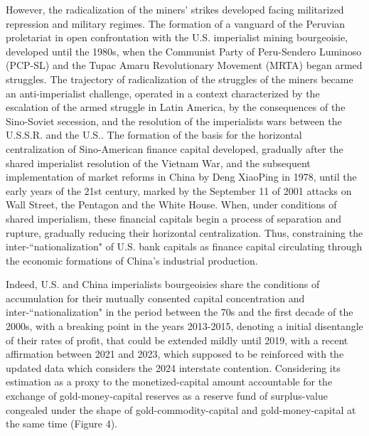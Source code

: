 \documentclass[]{interact}
\theoremstyle{plain}%
\theoremstyle{definition}
\theoremstyle{remark}
\begin{document}
However, the radicalization of the miners' strikes developed facing militarized repression and military regimes. The formation of a vanguard of the Peruvian proletariat in open confrontation with the U.S. imperialist mining bourgeoisie, developed until the 1980s, when the Communist Party of Peru-Sendero Luminoso (PCP-SL) and the Tupac Amaru Revolutionary Movement (MRTA) began armed struggles. The trajectory of radicalization of the struggles of the miners became an anti-imperialist challenge, operated in a context characterized by the escalation of the armed struggle in Latin America, by the consequences of the Sino-Soviet secession, and the resolution of the imperialists wars between the U.S.S.R. and the U.S.. The formation of the basis for the horizontal centralization of Sino-American finance capital developed, gradually after the shared imperialist resolution of the Vietnam War, and the subsequent implementation of market reforms in China by Deng XiaoPing in 1978, until the early years of the 21st century, marked by the September 11 of 2001 attacks on Wall Street, the Pentagon and the White House. When, under conditions of shared imperialism, these financial capitals begin a process of separation and rupture, gradually reducing their horizontal centralization. Thus, constraining the inter-“nationalization" of U.S. bank capitals as finance capital circulating through the economic formations of China's industrial production.

Indeed, U.S. and China imperialists bourgeoisies share the conditions of accumulation for their mutually consented capital concentration and inter-“nationalization" in the period between the 70s and the first decade of the 2000s, with a breaking point in the years 2013-2015, denoting a initial disentangle of their rates of profit, that could be extended mildly until 2019, with a recent affirmation between 2021 and 2023, which supposed to be reinforced with the updated data which considers the 2024 interstate contention. Considering its estimation as a proxy to the monetized-capital amount accountable for the exchange of gold-money-capital reserves as a reserve fund of surplus-value congealed under the shape of gold-commodity-capital and gold-money-capital at the same time (Figure 4).
\end{document}
